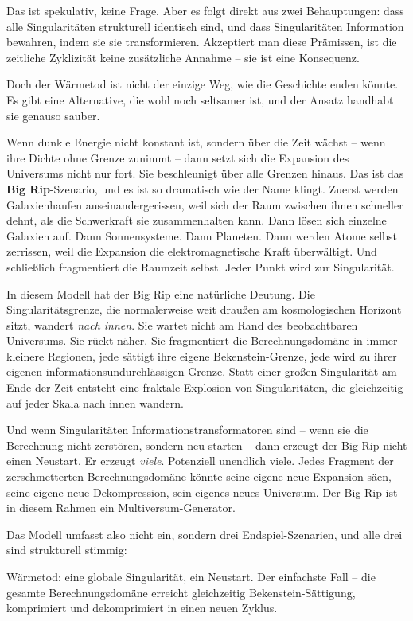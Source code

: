 \documentclass[11pt, twoside, openright]{book}
\begin{document}
Das ist spekulativ, keine Frage. Aber es folgt direkt aus zwei Behauptungen: dass alle Singularitäten strukturell identisch sind, und dass Singularitäten Information bewahren, indem sie sie transformieren. Akzeptiert man diese Prämissen, ist die zeitliche Zyklizität keine zusätzliche Annahme -- sie ist eine Konsequenz.

Doch der Wärmetod ist nicht der einzige Weg, wie die Geschichte enden könnte. Es gibt eine Alternative, die wohl noch seltsamer ist, und der Ansatz handhabt sie genauso sauber.

Wenn dunkle Energie nicht konstant ist, sondern über die Zeit wächst -- wenn ihre Dichte ohne Grenze zunimmt -- dann setzt sich die Expansion des Universums nicht nur fort. Sie beschleunigt über alle Grenzen hinaus. Das ist das \textbf{Big Rip}-Szenario, und es ist so dramatisch wie der Name klingt. Zuerst werden Galaxienhaufen auseinandergerissen, weil sich der Raum zwischen ihnen schneller dehnt, als die Schwerkraft sie zusammenhalten kann. Dann lösen sich einzelne Galaxien auf. Dann Sonnensysteme. Dann Planeten. Dann werden Atome selbst zerrissen, weil die Expansion die elektromagnetische Kraft überwältigt. Und schließlich fragmentiert die Raumzeit selbst. Jeder Punkt wird zur Singularität.

In diesem Modell hat der Big Rip eine natürliche Deutung. Die Singularitätsgrenze, die normalerweise weit draußen am kosmologischen Horizont sitzt, wandert \textit{nach innen}. Sie wartet nicht am Rand des beobachtbaren Universums. Sie rückt näher. Sie fragmentiert die Berechnungsdomäne in immer kleinere Regionen, jede sättigt ihre eigene Bekenstein-Grenze, jede wird zu ihrer eigenen informationsundurchlässigen Grenze. Statt einer großen Singularität am Ende der Zeit entsteht eine fraktale Explosion von Singularitäten, die gleichzeitig auf jeder Skala nach innen wandern.

Und wenn Singularitäten Informationstransformatoren sind -- wenn sie die Berechnung nicht zerstören, sondern neu starten -- dann erzeugt der Big Rip nicht einen Neustart. Er erzeugt \textit{viele}. Potenziell unendlich viele. Jedes Fragment der zerschmetterten Berechnungsdomäne könnte seine eigene neue Expansion säen, seine eigene neue Dekompression, sein eigenes neues Universum. Der Big Rip ist in diesem Rahmen ein Multiversum-Generator.

Das Modell umfasst also nicht ein, sondern drei Endspiel-Szenarien, und alle drei sind strukturell stimmig:

Wärmetod: eine globale Singularität, ein Neustart. Der einfachste Fall -- die gesamte Berechnungsdomäne erreicht gleichzeitig Bekenstein-Sättigung, komprimiert und dekomprimiert in einen neuen Zyklus.
\end{document}
